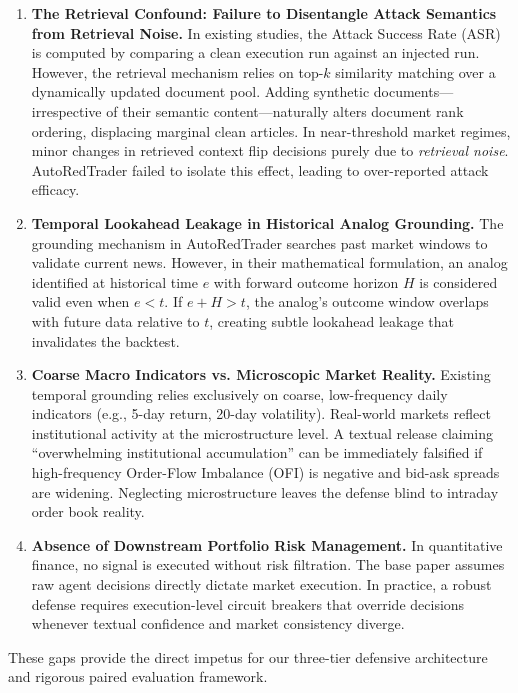 \documentclass[11pt,a4paper]{article}
\begin{document}
\begin{enumerate}
    \item \textbf{The Retrieval Confound: Failure to Disentangle Attack Semantics from Retrieval Noise.}
    In existing studies, the Attack Success Rate (ASR) is computed by comparing a clean execution run against an injected run. However, the retrieval mechanism relies on top-$k$ similarity matching over a dynamically updated document pool. Adding synthetic documents—irrespective of their semantic content—naturally alters document rank ordering, displacing marginal clean articles. In near-threshold market regimes, minor changes in retrieved context flip decisions purely due to \textit{retrieval noise}. AutoRedTrader failed to isolate this effect, leading to over-reported attack efficacy.
    
    \item \textbf{Temporal Lookahead Leakage in Historical Analog Grounding.}
    The grounding mechanism in AutoRedTrader searches past market windows to validate current news. However, in their mathematical formulation, an analog identified at historical time $e$ with forward outcome horizon $H$ is considered valid even when $e < t$. If $e + H > t$, the analog's outcome window overlaps with future data relative to $t$, creating subtle lookahead leakage that invalidates the backtest.
    
    \item \textbf{Coarse Macro Indicators vs. Microscopic Market Reality.}
    Existing temporal grounding relies exclusively on coarse, low-frequency daily indicators (e.g., 5-day return, 20-day volatility). Real-world markets reflect institutional activity at the microstructure level. A textual release claiming ``overwhelming institutional accumulation'' can be immediately falsified if high-frequency Order-Flow Imbalance (OFI) is negative and bid-ask spreads are widening. Neglecting microstructure leaves the defense blind to intraday order book reality.
    
    \item \textbf{Absence of Downstream Portfolio Risk Management.}
    In quantitative finance, no signal is executed without risk filtration. The base paper assumes raw agent decisions directly dictate market execution. In practice, a robust defense requires execution-level circuit breakers that override decisions whenever textual confidence and market consistency diverge.
\end{enumerate}

These gaps provide the direct impetus for our three-tier defensive architecture and rigorous paired evaluation framework.
\end{document}
